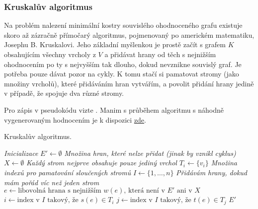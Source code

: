 \subsubsection{Kruskalův algoritmus}
\label{sssec:kruskaluv-algoritmus}

Na problém nalezení minimální kostry souvislého ohodnoceného grafu existuje
skoro až zázračně přímočarý algoritmus, pojmenovaný po americkém matematiku,
Josephu B. Kruskalovi. Jeho základní myšlenkou je prostě začít s grafem $K$
obsahujícím všechny vrcholy z $V$ a přidávat hrany od těch s nejnižším
ohodnocením po ty s nejvyšším tak dlouho, dokud nevznikne souvislý graf. Je
potřeba pouze dávat pozor na cykly. K tomu stačí si pamatovat stromy (jako
množiny vrcholů), které přidáváním hran vytvářím, a povolit přidání hrany
jedině v případě, že spojuje dva různé stromy.

Pro zápis v pseudokódu vizte . Manim s průběhem
algoritmu s náhodně vygenerovaným hodnocením je k dispozici
\href{https://raw.githubusercontent.com/Tesser3kt/GEVO/main/Seminar/animations/media/videos/graphs/2160p60/SpanningTreeExample.mp4}{zde}.

\pagebreak

\begin{algorithm}
 \caption{Kruskalův algoritmus.}
 \label{alg:kruskal}


 \BlankLine
 \emph{Inicializace}\;
 $E' \leftarrow \emptyset$\;
 \emph{Množina hran, které nelze přidat (jinak by vznikl cyklus)}\;
 $X \leftarrow \emptyset$\;
  {
  \emph{Každý strom nejprve obsahuje pouze jediný vrchol}\;
  $T_i \leftarrow \{v_i\}$\;
 }
 \emph{Množina indexů pro pamatování sloučených stromů}\;
 $I \leftarrow \{1,\ldots,n\}$\;
 \BlankLine
 \emph{Přidávám hrany, dokud mám pořád víc než jeden strom}\;
  {
  $e \leftarrow \text{libovolná hrana s nejnižším } w(e) \text{, která není v }
  E' \text{ ani v } X$\;
  $i \leftarrow \text{index v } I \text{ takový, že } s(e) \in T_i$\;
  $j \leftarrow \text{index v } I \text{ takový, že } t(e) \in T_j$\;
  \BlankLine
 }
 \KwReturn $E'$\;
\end{algorithm}

